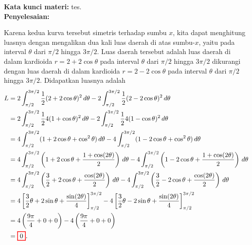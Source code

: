 \documentclass[10pt,openany,a4paper]{article}
\theoremstyle{definition}
\theoremstyle{definition}
\theoremstyle{plain}
\newenvironment{jawab}[2][tes]{
\textbf{Kata kunci materi:} #1.\\
\textbf{Penyelesaian:} #2
}{}
\newenvironment{jawaban}[2][tes]{
\colorlet{oldcolor}{.}
        \color{red}
        \setlength{\fboxrule}{1pt}\boxed{\color{oldcolor}#2}\color{oldcolor}.
}{}
\begin{document}
\begin{enumerate}
\begin{jawab}
{\begin{center}
\begin{tikzpicture}
                \end{tikzpicture}
            \end{center}
            Karena kedua kurva tersebut simetris terhadap sumbu $x$, kita dapat menghitung luasnya dengan mengalikan dua kali luas daerah di atas sumbu-$x$, yaitu pada interval $\theta$ dari $\pi/2$ hingga $3\pi/2$. 
            Luas daerah tersebut adalah luas daerah di dalam kardioida $r=2+2\cos\theta$ pada interval $\theta$ dari $\pi/2$ hingga $3\pi/2$ dikurangi dengan luas daerah di dalam kardioida $r=2-2\cos\theta$ pada interval $\theta$ dari $\pi/2$ hingga $3\pi/2$. Didapatkan luasnya adalah 
            \begin{align*}L &= 2\int_{\pi/2}^{3\pi/2} \frac{1}{2}(2+2\cos \theta)^2 \, d\theta - 2\int_{\pi/2}^{3\pi/2} \frac{1}{2}(2-2\cos \theta)^2 \, d\theta\\
&=  2\int_{\pi/2}^{3\pi/2} \frac{1}{2}4(1+\cos \theta)^2 \, d\theta - 2\int_{\pi/2}^{3\pi/2} \frac{1}{2}4(1-\cos \theta)^2 \, d\theta\\
&= 4\int_{\pi/2}^{3\pi/2} (1 + 2\cos \theta + \cos^2 \theta) \, d\theta - 4\int_{\pi/2}^{3\pi/2} (1 - 2\cos \theta + \cos^2 \theta) \, d\theta\\
&= 4\int_{\pi/2}^{3\pi/2} \left(1 + 2\cos \theta + \frac{1 + \cos(2\theta)}{2}\right) \, d\theta - 4\int_{\pi/2}^{3\pi/2} \left(1 - 2\cos \theta +  \frac{1 + \cos(2\theta)}{2}\right) \, d\theta\\
&= 4\int_{\pi/2}^{3\pi/2} \left(\frac{3}{2} + 2\cos \theta + \frac{\cos(2\theta)}{2}\right) \, d\theta - 4\int_{\pi/2}^{3\pi/2} \left(\frac{3}{2} - 2\cos \theta + \frac{\cos(2\theta)}{2}\right) \, d\theta\\
&= 4\left[\frac{3}{2}\theta + 2\sin \theta + \frac{\sin(2\theta)}{4}\right]_{\pi/2}^{3\pi/2} - 4\left[\frac{3}{2}\theta - 2\sin \theta + \frac{\sin(2\theta)}{4}\right]_{\pi/2}^{3\pi/2}\\
&= 4\left(\frac{9\pi}{4} + 0 + 0\right) - 4\left(\frac{9\pi}{4} + 0 + 0\right)\\
&= \begin{jawaban}{0}\end{jawaban}
\end{align*}
                 }
                 \end{jawab}
            \end{enumerate}
\end{document}
